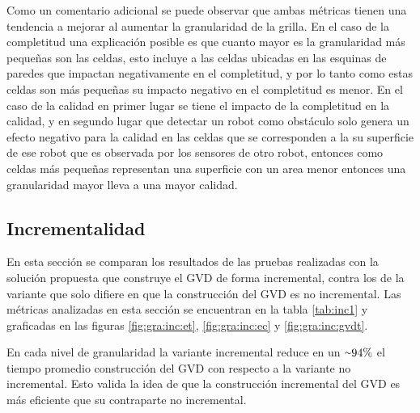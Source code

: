 Como un comentario adicional se puede observar que ambas métricas tienen una
tendencia a mejorar al aumentar la granularidad de la grilla. En el caso de la
completitud una explicación posible es que cuanto mayor es la granularidad
más pequeñas son las celdas, esto incluye a las celdas ubicadas en las esquinas de
paredes que impactan negativamente en el completitud, y por lo tanto como estas celdas son
más pequeñas su impacto negativo en el completitud es menor. En el caso de la
calidad en primer lugar se tiene el impacto de la completitud en la calidad, y en
segundo lugar que detectar un robot como obstáculo solo genera un efecto
negativo para la calidad en las celdas que se corresponden a la su superficie
de ese robot que es observada por los sensores de otro robot, entonces como
celdas más pequeñas representan una superficie con un area menor entonces una
granularidad mayor lleva a una mayor calidad.




\subsection{Incrementalidad}\label{sec:exp:inc}
En esta sección se comparan los resultados de las pruebas realizadas con la
solución propuesta que construye el GVD de forma incremental, contra los de la 
variante que solo difiere en que la construcción del GVD es no incremental. Las
métricas analizadas en esta sección se encuentran en la tabla \ref{tab:inc1}
y graficadas en las figuras \ref{fig:gra:inc:et}, \ref{fig:gra:inc:ec} y
\ref{fig:gra:inc:gvdt}.

En cada nivel de granularidad la variante incremental reduce en un
${\smallsim}94\%$ el tiempo promedio construcción del GVD con respecto a la
variante no incremental. Esto valida la idea de que la construcción incremental
del GVD es más eficiente que su contraparte no incremental.

